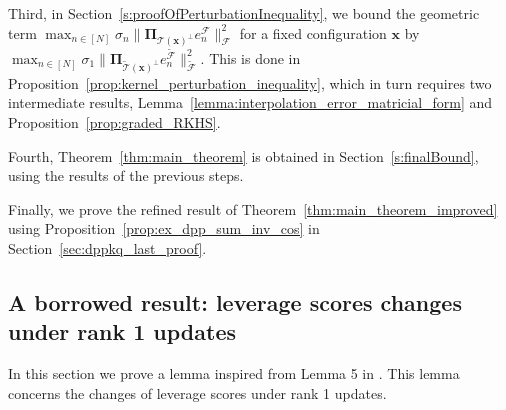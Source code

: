 \documentclass[twoside,11pt]{book}
\numberwithin{theorem}{chapter}
\numberwithin{definition}{chapter}
\numberwithin{proposition}{chapter}
\numberwithin{corollary}{chapter}
\numberwithin{example}{chapter}
\numberwithin{lemma}{chapter}
\numberwithin{assumption}{chapter}
\numberwithin{equation}{chapter}
\numberwithin{figure}{chapter}
\begin{document}
Third, in Section~\ref{s:proofOfPerturbationInequality}, we bound the geometric term $\max_{n \in [N]} \sigma_{n} \|\bm{\Pi}_{\mathcal{T}(\bm{x})^{\perp}} e_{n}^{\mathcal{F}}\|_{\mathcal{F}}^{2}$ for a fixed configuration $\bm{x}$ by $\max_{n \in [N]} \sigma_{1} \|\bm{\Pi}_{\tilde{\mathcal{T}}(\bm{x})^{\perp}} e_{n}^{\tilde{\mathcal{F}}}\|_{\tilde{\mathcal{F}}}^{2}$. This is done in Proposition~\ref{prop:kernel_perturbation_inequality}, which in turn requires two intermediate results, Lemma~\ref{lemma:interpolation_error_matricial_form} and Proposition~\ref{prop:graded_RKHS}.



Fourth, Theorem~\ref{thm:main_theorem} is obtained in Section~\ref{s:finalBound}, using the results of the previous steps.

Finally, we prove the refined result of Theorem~\ref{thm:main_theorem_improved} using Proposition~\ref{prop:ex_dpp_sum_inv_cos} in Section~\ref{sec:dppkq_last_proof}.  


\subsection{A borrowed result: leverage scores changes under rank 1 updates} \label{subsec:lv_score_updates}


In this section we prove a lemma inspired from Lemma 5 in \cite{Coh15}. This lemma concerns the changes of leverage scores under rank 1 updates.

\end{document}
